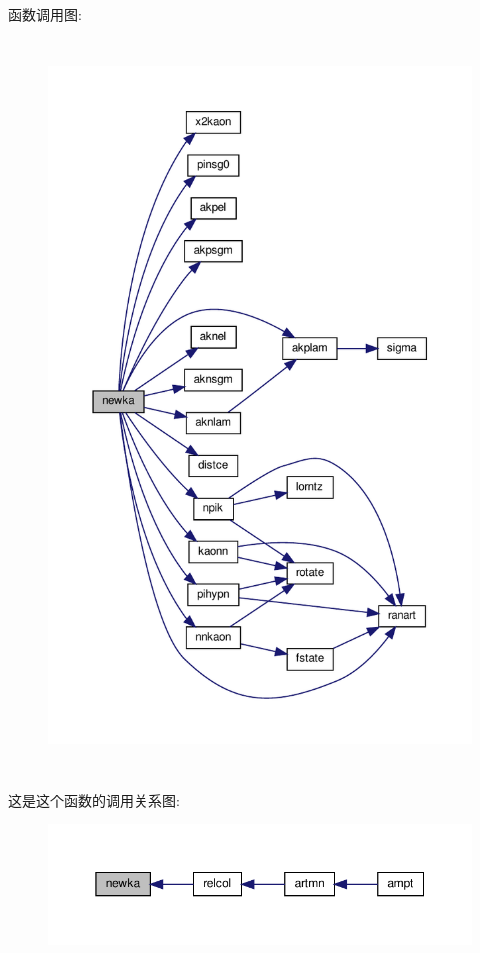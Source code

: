 函数调用图\+:
\nopagebreak
\begin{figure}[H]
\begin{center}
\leavevmode
\includegraphics[height=550pt]{newka_8f90_ab2b221cb7c41f91db530b21500d0976d_cgraph}
\end{center}
\end{figure}
这是这个函数的调用关系图\+:
\nopagebreak
\begin{figure}[H]
\begin{center}
\leavevmode
\includegraphics[width=350pt]{newka_8f90_ab2b221cb7c41f91db530b21500d0976d_icgraph}
\end{center}
\end{figure}
